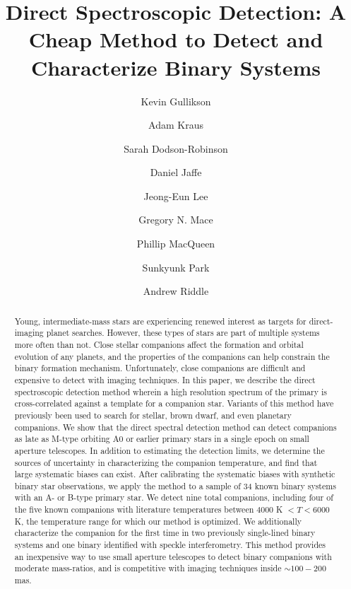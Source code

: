 \documentclass{emulateapj}
\begin{document}
\title{Direct Spectroscopic Detection: A Cheap Method to Detect and Characterize Binary Systems}

\author{Kevin Gullikson }
\author{Adam Kraus }
\author{Sarah Dodson-Robinson }
\author{Daniel Jaffe }
\author{Jeong-Eun Lee }
\author{Gregory N. Mace }
\author{Phillip MacQueen }
\author{Sunkyunk Park }
\author{Andrew Riddle }




\begin{abstract}
Young, intermediate-mass stars are experiencing renewed interest as targets for direct-imaging planet searches. However, these types of stars are part of multiple systems more often than not. Close stellar companions affect the formation and orbital evolution of any planets, and the properties of the companions can help constrain the binary formation mechanism. Unfortunately, close companions are difficult and expensive to detect with imaging techniques. In this paper, we describe the direct spectroscopic detection method wherein a high resolution spectrum of the primary is cross-correlated against a template for a companion star. Variants of this method have previously been used to search for stellar, brown dwarf, and even planetary companions. We show that the direct spectral detection method can detect companions as late as M-type orbiting A0 or earlier primary stars in a single epoch on small aperture telescopes. In addition to estimating the detection limits, we determine the sources of uncertainty in characterizing the companion temperature, and find that large systematic biases can exist. After calibrating the systematic biases with synthetic binary star observations, we apply the method to a sample of 34 known binary systems with an A- or B-type primary star. We detect nine total companions, including four of the five known companions with literature temperatures between $4000$ K $ < T < 6000$ K, the temperature range for which our method is optimized. We additionally characterize the companion for the first time in two previously single-lined binary systems and one binary identified with speckle interferometry. This method provides an inexpensive way to use small aperture telescopes to detect binary companions with moderate mass-ratios, and is competitive with imaging techniques inside $\sim 100-200$ mas.
\end{abstract}
\end{document}
